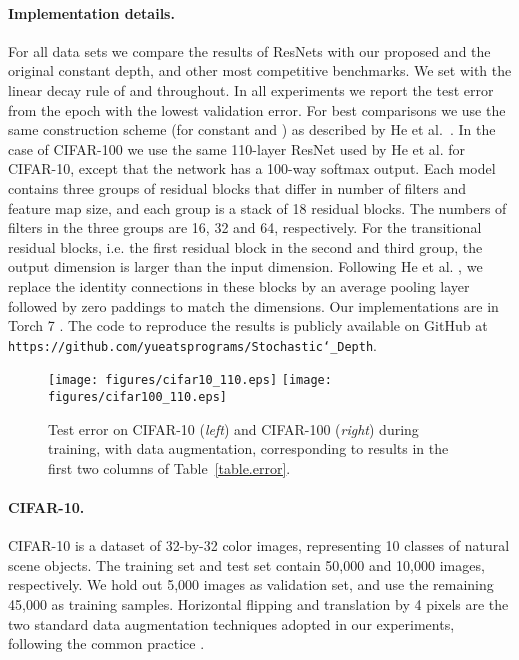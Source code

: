 \documentclass[runningheads]{llncs}
\begin{document}
\paragraph{\textbf{Implementation details.}}
For all data sets we compare the results of ResNets with our proposed \name{} and the original constant depth, and other most competitive benchmarks. We set  with the linear decay rule of  and  throughout. In all experiments we report the test error from the epoch with the lowest validation error.
For best comparisons we use the same construction scheme (for constant and \name{}) as described by He et al.~\cite{he2015deep}. In the case of CIFAR-100 we use the same 110-layer ResNet used by He et al. \cite{he2015deep} for CIFAR-10, except that the network has a 100-way softmax output. Each model contains three groups of residual blocks that differ in number of filters and feature map size, and each group is a stack of 18 residual blocks. The numbers of filters in the three groups are 16, 32 and 64, respectively. For the transitional residual blocks, i.e. the first residual block in the second and third group, the output dimension is larger than the input dimension. Following He et al. \cite{he2015deep}, we replace the identity connections in these blocks by an average pooling layer followed by zero paddings to match the dimensions.
Our implementations are in Torch 7 \cite{collobert2011torch7}. The code to reproduce the results is publicly available on GitHub at {\tt https://github.com/yueatsprograms/Stochastic\char`_Depth}.

\begin{figure*}[t]
	\begin{center}
		\centerline{
			\texttt{[image: figures/cifar10\_110.eps]}
			\texttt{[image: figures/cifar100\_110.eps]}}
		\vspace{-2ex}
		\caption{Test error on CIFAR-10 (\textit{left}) and CIFAR-100 (\textit{right}) during training,  with data augmentation, corresponding to results in the first two columns of Table~\ref{table.error}.}
		\vspace{-8ex}
		\label{figure.cifar}
	\end{center}
\end{figure*}

\paragraph{\textbf{CIFAR-10.}}
CIFAR-10 \cite{krizhevsky2009learning} is a dataset of 32-by-32 color images, representing 10 classes of natural scene objects. The training set and test set contain 50,000 and 10,000 images, respectively. We hold out 5,000 images as validation set, and use the remaining 45,000 as training samples. Horizontal flipping and translation by 4 pixels are the two standard data augmentation techniques adopted in our experiments, following the common practice \cite{goodfellow2013maxout,icml2013_wan13,lin2013network,lee2014deeply,springenberg2014striving,agostinelli2014learning,lee2015generalizing}.
\end{document}
